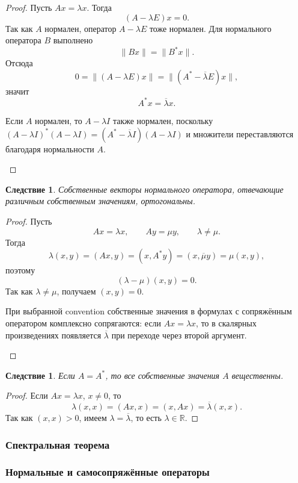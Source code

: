 \documentclass[12pt,a4paper]{article}
\theoremstyle{definition}
\theoremstyle{plain}
\newtheorem{corollary}[definition]{Следствие}
\theoremstyle{remark}
\newenvironment{knowledgefix}{\begin{clarifybox}}{\end{clarifybox}}
\newcommand{\R}{\mathbb{R}}
\begin{document}
\begin{proof}
Пусть $Ax=\lambda x$. Тогда
\[
    (A-\lambda E)x=0.
\]
Так как $A$ нормален, оператор $A-\lambda E$ тоже нормален. Для нормального оператора $B$ выполнено
\[
    \|Bx\|=\|B^*x\|.
\]
Отсюда
\[
    0=\|(A-\lambda E)x\|=\|(A^*-\overline\lambda E)x\|,
\]
значит
\[
    A^*x=\overline\lambda x.
\]
\begin{knowledgefix}
Если \(A\) нормален, то \(A-\lambda I\) также нормален, поскольку \((A-\lambda I)^*(A-\lambda I)=(A^*-\overline\lambda I)(A-\lambda I)\) и множители переставляются благодаря нормальности \(A\).
\end{knowledgefix}
\end{proof}

\begin{corollary}
Собственные векторы нормального оператора, отвечающие различным собственным значениям, ортогональны.
\end{corollary}

\begin{proof}
Пусть
\[
    Ax=\lambda x,
    \qquad
    Ay=\mu y,
    \qquad
    \lambda\ne\mu.
\]
Тогда
\[
    \lambda(x,y)=(Ax,y)=(x,A^*y)=(x,\overline\mu y)=\mu(x,y),
\]
поэтому
\[
    (\lambda-\mu)(x,y)=0.
\]
Так как $\lambda\ne\mu$, получаем $(x,y)=0$.
\begin{knowledgefix}
При выбранной convention собственные значения в формулах с сопряжённым оператором комплексно сопрягаются: если \(Ax=\lambda x\), то в скалярных произведениях появляется \(\overline\lambda\) при переходе через второй аргумент.
\end{knowledgefix}
\end{proof}

\begin{corollary}
Если $A=A^*$, то все собственные значения $A$ вещественны.
\end{corollary}

\begin{proof}
Если $Ax=\lambda x$, $x\ne0$, то
\[
    \lambda(x,x)=(Ax,x)=(x,Ax)=\overline{\lambda}(x,x).
\]
Так как $(x,x)>0$, имеем $\lambda=\overline\lambda$, то есть $\lambda\in\R$.
\end{proof}

\subsubsection{Спектральная теорема}

\subsubsection*{Нормальные и самосопряжённые операторы}
\end{document}
